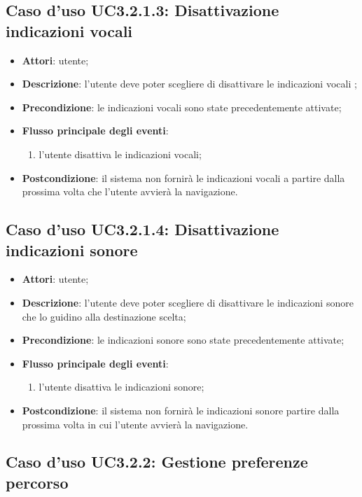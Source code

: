 \documentclass[../AnalisiDeiRequisiti.tex]{subfiles}
\begin{document}
\subsection{Caso d'uso UC3.2.1.3: Disattivazione indicazioni vocali}
\begin{itemize}
\item \textbf{Attori}: utente;
\item \textbf{Descrizione}: l'utente deve poter scegliere di disattivare le indicazioni vocali ; 
      \item \textbf{Precondizione}: le indicazioni vocali sono state precedentemente attivate;
      \item \textbf{Flusso principale degli eventi}:
          \begin{enumerate}
          \item l'utente disattiva le indicazioni vocali;
      \end{enumerate}
    \item \textbf{Postcondizione}: il sistema non fornirà le indicazioni vocali a partire dalla prossima volta che l'utente avvierà la navigazione.
  \end{itemize}
\hypertarget{UC3.2.1.4}{}
\subsection{Caso d'uso UC3.2.1.4: Disattivazione indicazioni sonore}
\begin{itemize}
\item \textbf{Attori}: utente;
\item \textbf{Descrizione}: l'utente deve poter scegliere di disattivare le indicazioni sonore che lo guidino alla destinazione scelta; 
      \item \textbf{Precondizione}: le indicazioni sonore sono state precedentemente attivate;
      \item \textbf{Flusso principale degli eventi}:
          \begin{enumerate}
          \item l'utente disattiva le indicazioni sonore;
      \end{enumerate}
    \item \textbf{Postcondizione}: il sistema non fornirà le indicazioni sonore partire dalla prossima volta in cui l'utente avvierà la navigazione.
  \end{itemize}
\hypertarget{UC3.2.2}{}
\subsection{Caso d'uso UC3.2.2: Gestione preferenze percorso}
\end{document}
